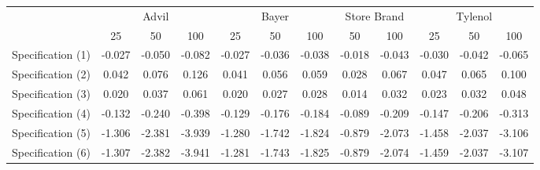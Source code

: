 {
\def\sym#1{\ifmmode^{#1}\else\(^{#1}\)\fi}
\begin{tabular}{l*{11}{c}}
\hline\hline
                    &\multicolumn{3}{c}{Advil}             &\multicolumn{3}{c}{Bayer}             &\multicolumn{2}{c}{Store Brand}&\multicolumn{3}{c}{Tylenol}           \\\cmidrule(lr){2-4}\cmidrule(lr){5-7}\cmidrule(lr){8-9}\cmidrule(lr){10-12}
                    &\multicolumn{1}{c}{25}&\multicolumn{1}{c}{50}&\multicolumn{1}{c}{100}&\multicolumn{1}{c}{25}&\multicolumn{1}{c}{50}&\multicolumn{1}{c}{100}&\multicolumn{1}{c}{50}&\multicolumn{1}{c}{100}&\multicolumn{1}{c}{25}&\multicolumn{1}{c}{50}&\multicolumn{1}{c}{100}\\
\hline
Specification (1)   &      -0.027&      -0.050&      -0.082&      -0.027&      -0.036&      -0.038&      -0.018&      -0.043&      -0.030&      -0.042&      -0.065\\
Specification (2)   &       0.042&       0.076&       0.126&       0.041&       0.056&       0.059&       0.028&       0.067&       0.047&       0.065&       0.100\\
Specification (3)   &       0.020&       0.037&       0.061&       0.020&       0.027&       0.028&       0.014&       0.032&       0.023&       0.032&       0.048\\
Specification (4)   &      -0.132&      -0.240&      -0.398&      -0.129&      -0.176&      -0.184&      -0.089&      -0.209&      -0.147&      -0.206&      -0.313\\
Specification (5)   &      -1.306&      -2.381&      -3.939&      -1.280&      -1.742&      -1.824&      -0.879&      -2.073&      -1.458&      -2.037&      -3.106\\
Specification (6)   &      -1.307&      -2.382&      -3.941&      -1.281&      -1.743&      -1.825&      -0.879&      -2.074&      -1.459&      -2.037&      -3.107\\
\hline\hline
\end{tabular}
}
